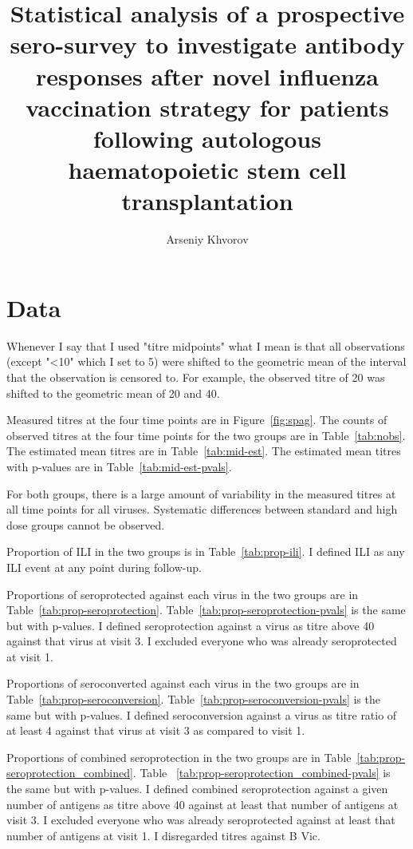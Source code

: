 \documentclass[11pt]{article}
\title{Statistical analysis of a prospective sero-survey to investigate
antibody responses
after novel influenza vaccination strategy
for patients following autologous
haematopoietic stem cell transplantation}
\author{Arseniy Khvorov}
\begin{document}
\maketitle

\section{Data}

Whenever I say that I used "titre midpoints" what I mean is that all
observations (except "<10" which I set to 5) were shifted to the geometric mean
of the interval that the observation is censored to. For example, the observed
titre of 20 was shifted to the geometric mean of 20 and 40.

Measured titres at the four time points are in Figure~\ref{fig:spag}.
The counts of observed titres at the four time points for the two groups are
in Table~\ref{tab:nobs}.
The estimated mean titres are in Table~\ref{tab:mid-est}.
The estimated mean titres with p-values are in Table~\ref{tab:mid-est-pvals}.

For both groups, there is a large amount of variability in the measured titres
at all time points for all viruses. Systematic differences between standard and
high dose groups cannot be observed.

Proportion of ILI in the two groups is in Table~\ref{tab:prop-ili}.
I defined ILI as any ILI event at any point during follow-up.

Proportions of seroprotected against each virus
in the two groups are in
Table~\ref{tab:prop-seroprotection}.
Table~\ref{tab:prop-seroprotection-pvals} is the same but with p-values.
I defined seroprotection against a virus as titre above 40 against that virus
at visit 3. I excluded everyone who was already seroprotected at visit 1.

Proportions of seroconverted against each virus
in the two groups are in
Table~\ref{tab:prop-seroconversion}.
Table~\ref{tab:prop-seroconversion-pvals} is the same but with p-values.
I defined seroconversion against a virus as titre ratio of at least 4 against
that virus at visit 3 as compared to visit 1.

Proportions of combined seroprotection
in the two groups are in
Table~\ref{tab:prop-seroprotection_combined}. Table ~\ref{tab:prop-seroprotection_combined-pvals} is the same but with p-values.
I defined combined seroprotection against a given number of antigens
as titre above 40 against at least that number of antigens
at visit 3. I excluded everyone who was already seroprotected
against at least that number of antigens at visit 1.
I disregarded titres against B Vic.
\end{document}
